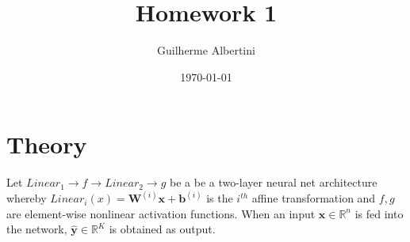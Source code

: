 \documentclass{article}
\title{Homework 1}
\author{Guilherme Albertini}
\date\today
\begin{document}
\maketitle %

\section*{Theory}
Let $Linear_1 \rightarrow f \rightarrow  Linear_2 \rightarrow g $ be a be a
two-layer neural net architecture whereby $Linear_i(x) =
  \bm{W}^{(i)}\bm{x}+\bm{b}^{(i)}$ is the $i^{th}$ affine transformation and
$f,
  g$ are element-wise nonlinear activation functions. When an input $\bm{x}\in
  \mathbb{R}^n$ is fed into the network, $\bm{\hat{y}} \in \mathbb{R}^K$ is
obtained as output.
\end{document}
